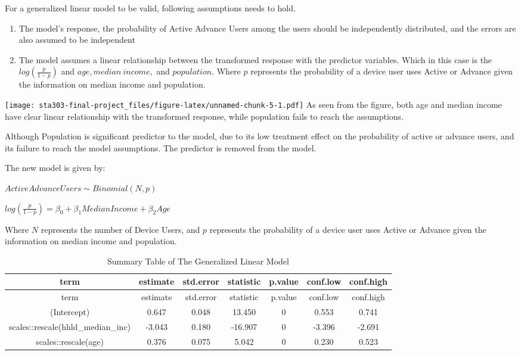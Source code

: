 \documentclass[
          english,
          paper=a4,
              ,captions=tableheading
  ]{scrartcl}
\begin{document}
For a generalized linear model to be valid, following assumptions needs
to hold.

\begin{enumerate}
\def\labelenumi{\arabic{enumi}.}
\item
  The model's response, the probability of Active Advance Users among
  the users should be independently distributed, and the errors are also
  assumed to be independent
\item
  The model assumes a linear relationship between the transformed
  response with the predictor variables. Which in this case is the
  \(log(\frac{p}{1-p})\) and \(age, median\ income,\) and
  \(population\). Where \(p\) represents the probability of a device
  user uses Active or Advance given the information on median income and
  population.
\end{enumerate}

\texttt{[image: sta303-final-project\_files/figure-latex/unnamed-chunk-5-1.pdf]}
As seen from the figure, both age and median income have clear linear
relationship with the transformed response, while population fails to
reach the assumptions.

Although Population is significant predictor to the model, due to its
low treatment effect on the probability of active or advance users, and
its failure to reach the model assumptions. The predictor is removed
from the model.

The new model is given by:

\(ActiveAdvanceUsers \sim Binomial(N,p)\)

\(log(\frac{p}{1-p})={\beta_0} +{\beta_1}MedianIncome+{\beta_2}Age\)

Where \(N\) represents the number of Device Users, and \(p\) represents
the probability of a device user uses Active or Advance given the
information on median income and population.

\begin{longtable}[]{@{}ccccccc@{}}
\caption{Summary Table of The Generalized Linear Model}\tabularnewline
\toprule
term & estimate & std.error & statistic & p.value & conf.low &
conf.high \\
\midrule
\endfirsthead
\toprule
term & estimate & std.error & statistic & p.value & conf.low &
conf.high \\
\midrule
\endhead
(Intercept) & 0.647 & 0.048 & 13.450 & 0 & 0.553 & 0.741 \\
scales::rescale(hhld\_median\_inc) & -3.043 & 0.180 & -16.907 & 0 &
-3.396 & -2.691 \\
scales::rescale(age) & 0.376 & 0.075 & 5.042 & 0 & 0.230 & 0.523 \\
\bottomrule
\end{longtable}
\end{document}
